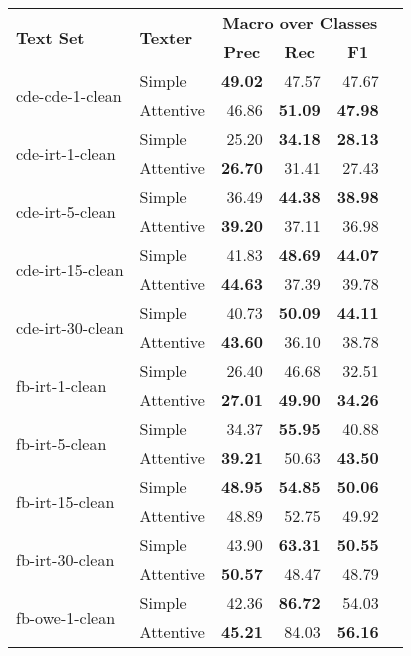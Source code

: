 \begin{tabular}{| l | l | r | r | r | r |}
    \hline

    \multirow{2}{*}{\textbf{Text Set}} &
    \multirow{2}{*}{\textbf{Texter}} &
    \multicolumn{3}{|c|}{\textbf{Macro over Classes}} \\

    & &
    \multicolumn{1}{|c|}{\textbf{Prec}} &
    \multicolumn{1}{|c|}{\textbf{Rec}} &
    \multicolumn{1}{|c|}{\textbf{F1}} \\ \hline \hline

    \multirow{2}{*}{cde-cde-1-clean}
    & Simple    & \textbf{49.02} & 47.57 & 47.67 \\
    & Attentive & 46.86 & \textbf{51.09} & \textbf{47.98} \\ \hline

    \multirow{2}{*}{cde-irt-1-clean}
    & Simple    & 25.20 & \textbf{34.18} & \textbf{28.13} \\
    & Attentive & \textbf{26.70} & 31.41 & 27.43 \\ \hline

    \multirow{2}{*}{cde-irt-5-clean}
    & Simple    & 36.49 & \textbf{44.38} & \textbf{38.98} \\
    & Attentive & \textbf{39.20} & 37.11 & 36.98 \\ \hline

    \multirow{2}{*}{cde-irt-15-clean}
    & Simple    & 41.83 & \textbf{48.69} & \textbf{44.07} \\
    & Attentive & \textbf{44.63} & 37.39 & 39.78 \\ \hline

    \multirow{2}{*}{cde-irt-30-clean}
    & Simple    & 40.73 & \textbf{50.09} & \textbf{44.11} \\
    & Attentive & \textbf{43.60} & 36.10 & 38.78 \\ \hline \hline

    \multirow{2}{*}{fb-irt-1-clean}
    & Simple    & 26.40 & 46.68 & 32.51 \\
    & Attentive & \textbf{27.01} & \textbf{49.90} & \textbf{34.26} \\ \hline

    \multirow{2}{*}{fb-irt-5-clean}
    & Simple    & 34.37 & \textbf{55.95} & 40.88 \\
    & Attentive & \textbf{39.21} & 50.63 & \textbf{43.50} \\ \hline

    \multirow{2}{*}{fb-irt-15-clean}
    & Simple    & \textbf{48.95} & \textbf{54.85} & \textbf{50.06} \\
    & Attentive & 48.89 & 52.75 & 49.92 \\ \hline

    \multirow{2}{*}{fb-irt-30-clean}
    & Simple    & 43.90 & \textbf{63.31} & \textbf{50.55} \\
    & Attentive & \textbf{50.57} & 48.47 & 48.79 \\ \hline

    \multirow{2}{*}{fb-owe-1-clean}
    & Simple    & 42.36 & \textbf{86.72} & 54.03 \\
    & Attentive & \textbf{45.21} & 84.03 & \textbf{56.16} \\ \hline
\end{tabular}
